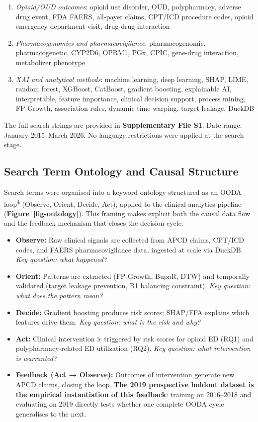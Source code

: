 \documentclass[
  12pt,
]{book}
\providecommand{\tightlist}{%
  \setlength{\itemsep}{0pt}\setlength{\parskip}{0pt}}
\begin{document}
\begin{enumerate}
\def\labelenumi{\arabic{enumi}.}
\tightlist
\item
  \emph{Opioid/OUD outcomes}: opioid use disorder, OUD, polypharmacy,
  adverse drug event, FDA FAERS, all-payer claims, CPT/ICD procedure
  codes, opioid emergency department visit, drug-drug interaction
\item
  \emph{Pharmacogenomics and pharmacovigilance}: pharmacogenomic,
  pharmacogenetic, CYP2D6, OPRM1, PGx, CPIC, gene-drug interaction,
  metabolizer phenotype
\item
  \emph{XAI and analytical methods}: machine learning, deep learning,
  SHAP, LIME, random forest, XGBoost, CatBoost, gradient boosting,
  explainable AI, interpretable, feature importance, clinical decision
  support, process mining, FP-Growth, association rules, dynamic time
  warping, target leakage, DuckDB
\end{enumerate}

The full search strings are provided in \textbf{Supplementary File S1}.
Date range: January 2015--March 2026. No language restrictions were
applied at the search stage.

\subsection{Search Term Ontology and Causal
Structure}\label{search-term-ontology-and-causal-structure}

Search terms were organised into a keyword ontology structured as an
OODA loop\textsuperscript{4} (Observe, Orient, Decide, Act), applied to
the clinical analytics pipeline (\textbf{Figure~\ref{fig-ontology}}).
This framing makes explicit both the causal data flow and the feedback
mechanism that closes the decision cycle:

\begin{itemize}
\tightlist
\item
  \textbf{Observe:} Raw clinical signals are collected from APCD claims,
  CPT/ICD codes, and FAERS pharmacovigilance data, ingested at scale via
  DuckDB. \emph{Key question: what happened?}
\item
  \textbf{Orient:} Patterns are extracted (FP-Growth, BupaR, DTW) and
  temporally validated (target leakage prevention, B1 balancing
  constraint). \emph{Key question: what does the pattern mean?}
\item
  \textbf{Decide:} Gradient boosting produces risk scores; SHAP/FFA
  explains which features drive them. \emph{Key question: what is the
  risk and why?}
\item
  \textbf{Act:} Clinical intervention is triggered by risk scores for
  opioid ED (RQ1) and polypharmacy-related ED utilization (RQ2).
  \emph{Key question: what intervention is warranted?}
\item
  \textbf{Feedback (Act → Observe):} Outcomes of intervention generate
  new APCD claims, closing the loop. \textbf{The 2019 prospective
  holdout dataset is the empirical instantiation of this feedback}:
  training on 2016--2018 and evaluating on 2019 directly tests whether
  one complete OODA cycle generalises to the next.
\end{itemize}
\end{document}
